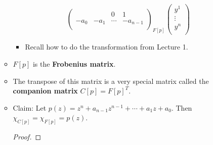 \documentclass[../notes.tex]{subfiles}
\begin{document}
\begin{itemize}
\begin{itemize}
\begin{equation*}
{\begin{pmatrix}
                     &  & 0 & 1\\
                    -a_0 & -a_1 & \cdots & -a_{n-1}\\
                \end{pmatrix}
            }_{F[p]}
            \begin{pmatrix}
                y^1\\
                \vdots\\
                y^n\\
            \end{pmatrix}
        \end{equation*}
        \begin{itemize}
            \item Recall how to do the transformation from Lecture 1.
        \end{itemize}
        \item $F[p]$ is the \textbf{Frobenius matrix}.
        \item The transpose of this matrix is a very special matrix called the \textbf{companion matrix} $C[p]=F[p]^T$.
        \item Claim: Let $p(z)=z^n+a_{n-1}z^{n-1}+\cdots+a_1z+a_0$. Then $\chi_{C[p]}=\chi_{F[p]}=p(z)$.
        \begin{proof}



\end{proof}
\end{itemize}
\end{itemize}
\end{document}
